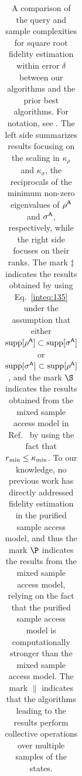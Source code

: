 \begin{table}[t]
\centering
\caption{A comparison of the query and sample complexities for square root fidelity estimation within error $\delta$ between our algorithms and the prior best algorithms. For notation, see . The left side summarizes results focusing on the scaling in $\kappa_\rho$ and $\kappa_\sigma$, the reciprocals of the minimum non-zero eigenvalues of $\rho^{\mathsf{A}}$ and $\sigma^{\mathsf{A}}$, respectively, while the right side focuses on their ranks.
The mark $\ddag$ indicates the results obtained by using Eq.~\eqref{inteq:135} under the assumption that either $\mathrm{supp}[\rho^{\mathsf{A}}] \subset \mathrm{supp}[\sigma^{\mathsf{A}}]$ or $\mathrm{supp}[\sigma^{\mathsf{A}}] \subset \mathrm{supp}[\rho^{\mathsf{A}}]$, and the mark $\S$ indicates the results obtained from the mixed sample access model in Ref.~\cite{gilyen2022improvedfidelity} by using the fact that $r_{\rm min} \leq \kappa_{\rm min}$.
To our knowledge, no previous work has directly addressed fidelity estimation in the purified sample access model, and thus the mark $\P$ indicates the results from the mixed sample access model, relying on the fact that the purified sample access model is computationally stronger than the mixed sample access model. The mark $\|$ indicates that the algorithms leading to the results perform collective operations over multiple samples of the states.}
\renewcommand{\arraystretch}{2.0}
\begin{tabular}{>{\centering\arraybackslash}m{7em}|
                >{\centering\arraybackslash}m{9em}
                >{\centering\arraybackslash}m{10em}
                >{\centering\arraybackslash}m{5em}
                >{\centering\arraybackslash}m{6em}}
                

\end{tabular}
\end{table}
